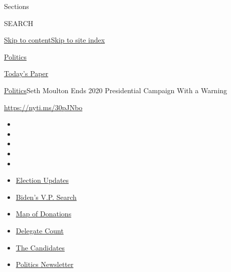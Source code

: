 Sections

SEARCH

\protect\hyperlink{site-content}{Skip to
content}\protect\hyperlink{site-index}{Skip to site index}

\href{https://www.nytimes.com/section/politics}{Politics}

\href{https://myaccount.nytimes.com/auth/login?response_type=cookie\&client_id=vi}{}

\href{https://www.nytimes.com/section/todayspaper}{Today's Paper}

\href{/section/politics}{Politics}\textbar{}Seth Moulton Ends 2020
Presidential Campaign With a Warning

\url{https://nyti.ms/30pJNbo}

\begin{itemize}
\item
\item
\item
\item
\item
\end{itemize}

\begin{itemize}
\item
  \href{https://www.nytimes.com/2020/07/31/us/elections/biden-vs-trump.html?action=click\&pgtype=Article\&state=default\&region=TOP_BANNER\&context=storylines_menu}{Election
  Updates}
\item
  \href{https://www.nytimes.com/article/biden-vice-president-2020.html?action=click\&pgtype=Article\&state=default\&region=TOP_BANNER\&context=storylines_menu}{Biden's
  V.P. Search}
\item
  \href{https://www.nytimes.com/interactive/2020/07/24/us/politics/trump-biden-campaign-donors.html?action=click\&pgtype=Article\&state=default\&region=TOP_BANNER\&context=storylines_menu}{Map
  of Donations}
\item
  \href{https://www.nytimes.com/interactive/2020/us/elections/delegate-count-primary-results.html?action=click\&pgtype=Article\&state=default\&region=TOP_BANNER\&context=storylines_menu}{Delegate
  Count}
\item
  \href{https://www.nytimes.com/interactive/2019/us/politics/2020-presidential-candidates.html?action=click\&pgtype=Article\&state=default\&region=TOP_BANNER\&context=storylines_menu}{The
  Candidates}
\item
  \href{https://www.nytimes.com/newsletters/politics?action=click\&pgtype=Article\&state=default\&region=TOP_BANNER\&context=storylines_menu}{Politics
  Newsletter}
\end{itemize}

